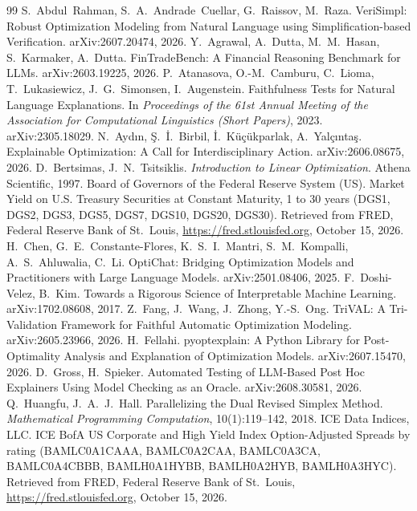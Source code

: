 \begin{thebibliography}{99}\small
{} S.~Abdul~Rahman, S.~A.~Andrade~Cuellar, G.~Raissov, M.~Raza. VeriSimpl: Robust
Optimization Modeling from Natural Language using Simplification-based Verification. arXiv:2607.20474, 2026.
 Y.~Agrawal, A.~Dutta, M.~M.~Hasan, S.~Karmaker, A.~Dutta. FinTradeBench: A Financial
Reasoning Benchmark for LLMs. arXiv:2603.19225, 2026.
 P.~Atanasova, O.-M.~Camburu, C.~Lioma, T.~Lukasiewicz, J.~G.~Simonsen, I.~Augenstein.
Faithfulness Tests for Natural Language Explanations. In \emph{Proceedings of the 61st Annual Meeting of the
Association for Computational Linguistics (Short Papers)}, 2023. arXiv:2305.18029.
 N.~Ayd{\i}n, {\c S}.~{\.I}.~Birbil, {\.I}.~K{\"u}{\c c}{\"u}kparlak, A.~Yal{\c c}{\i}nta{\c s}.
Explainable Optimization: A Call for Interdisciplinary Action. arXiv:2606.08675, 2026.
 D.~Bertsimas, J.~N.~Tsitsiklis. \emph{Introduction to Linear Optimization}.
Athena Scientific, 1997.
 Board of Governors of the Federal Reserve System (US). Market Yield on U.S. Treasury
Securities at Constant Maturity, 1 to 30 years (DGS1, DGS2, DGS3, DGS5, DGS7, DGS10, DGS20, DGS30).
Retrieved from FRED, Federal Reserve Bank of St.\ Louis, \url{https://fred.stlouisfed.org}, October 15, 2026.
 H.~Chen, G.~E.~Constante-Flores, K.~S.~I.~Mantri, S.~M.~Kompalli, A.~S.~Ahluwalia, C.~Li.
OptiChat: Bridging Optimization Models and Practitioners with Large Language Models. arXiv:2501.08406, 2025.
 F.~Doshi-Velez, B.~Kim. Towards a Rigorous Science of Interpretable Machine
Learning. arXiv:1702.08608, 2017.
 Z.~Fang, J.~Wang, J.~Zhong, Y.-S.~Ong. TriVAL: A Tri-Validation Framework for Faithful
Automatic Optimization Modeling. arXiv:2605.23966, 2026.
 H.~Fellahi. pyoptexplain: A Python Library for Post-Optimality Analysis and
Explanation of Optimization Models. arXiv:2607.15470, 2026.
 D.~Gross, H.~Spieker. Automated Testing of LLM-Based Post Hoc Explainers Using Model
Checking as an Oracle. arXiv:2608.30581, 2026.
 Q.~Huangfu, J.~A.~J.~Hall. Parallelizing the Dual Revised Simplex Method.
\emph{Mathematical Programming Computation}, 10(1):119--142, 2018.
 ICE Data Indices, LLC. ICE BofA US Corporate and High Yield Index Option-Adjusted Spreads
by rating (BAMLC0A1CAAA, BAMLC0A2CAA, BAMLC0A3CA, BAMLC0A4CBBB, BAMLH0A1HYBB, BAMLH0A2HYB, BAMLH0A3HYC).
Retrieved from FRED, Federal Reserve Bank of St.\ Louis, \url{https://fred.stlouisfed.org}, October 15, 2026.

\end{thebibliography}
